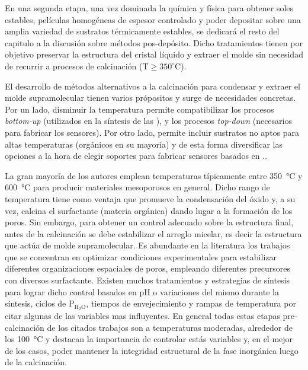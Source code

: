 	En una segunda etapa, una vez dominada la química y física para obtener soles estables, películas homogéneas de espesor controlado y poder depositar sobre una amplia variedad de sustratos térmicamente estables, se dedicará el resto del capitulo a la discusión sobre métodos pos-depósito. Dicho tratamientos tienen por objetivo preservar la estructura del cristal líquido y extraer el molde sin necesidad de recurrir a procesos de calcinación ($\text{T} \geq 350^\circ \text{C}$).

	El desarrollo de métodos alternativos a la calcinación para condensar y extraer el molde supramolecular tienen varios própositos y surge de necesidades concretas. Por un lado, disminuir la temperatura permite compatibilizar los procesos \textit{bottom-up} (utilizados en la síntesis de las \pdm), y los procesos \textit{top-down} (necesarios para fabricar los sensores). Por otro lado, permite incluir sustratos no aptos para altas temperaturas (orgánicos en su mayoría) y de esta forma diversificar las opciones a la hora de elegir soportes para fabricar sensores basados en \pdm.\cite{Doshi2000a,Wagner2013,Innocenzi2013,Soler-Illia2002a,Zhang2005}.

	La gran mayoría de los autores emplean temperaturas típicamente entre \SI{350}{\celsius} y \SI{600}{\celsius} para producir materiales mesoporosos en general.\cite{Kresge1992,Beck1992,DiRenzo1997}  Dicho rango de temperatura tiene como ventaja que promueve la condensación del óxido y, a su vez, calcina el surfactante (materia orgánica) dando lugar a la formación de los poros. Sin embargo, para obtener un control adecuado sobre la estructura final, antes de la calcinación se debe estabilizar el arreglo micelar, es decir la estructura que actúa de molde supramolecular. Es abundante en la literatura los trabajos que se concentran en optimizar condiciones experimentales para estabilizar diferentes organizaciones espaciales de poros, empleando diferentes precursores con diversos surfactante\cite{Huo1996,Herregods2013,Grosso2001}. Existen muchos tratamientos y estrategias de síntesis para lograr dicho control basados en pH o variaciones del mismo durante la síntesis\cite{Doshi2000a,Soler-Illia2011,Boissiere2000,Huo1996,GonzalezSolveyra2017,Ichinose2002}, ciclos de P$_\text{H$_2$O}$\cite{Cagnol2002,Soler-Illia2012}, tiempos de envejecimiento\cite{Malfatti2009,Grosso2001} y rampas de temperatura\cite{Huang2002,Andrini2016,Soler-Illia2006,Rohlfing2005} por citar algunas de las variables mas influyentes. En general todas estas etapas pre-calcinación de los citados trabajos son a temperaturas moderadas, alrededor de los \SI{100}{\celsius} y destacan la importancia de controlar estás variables y, en el mejor de los casos, poder mantener la integridad estructural de la fase inorgánica luego de la calcinación. 


